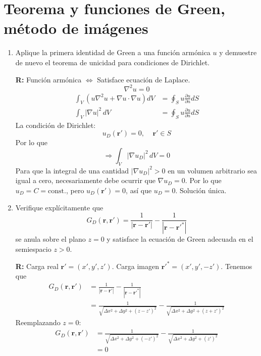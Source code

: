 \documentclass[]{article}
\numberwithin{equation}{section}
\newcommand{\0}{\textcolor{gray}{0}}
\newcommand{\gr}{\nabla}
\newcommand{\la}{\nabla^2}
\newcommand{\rv}{\mathbf{r}}
\newcommand{\rdif}{\rv - \rv'}
\begin{document}
\section{Teorema y funciones de Green, método de imágenes}
\begin{enumerate}
	\item Aplique la primera identidad de Green a una función armónica \(u\) y demuestre de nuevo el 	teorema de unicidad para condiciones de Dirichlet.
	
	\textbf{R:} Función armónica \(\Leftrightarrow\) Satisface ecuación de Laplace.
	\begin{equation*}
		\la u = 0
	\end{equation*}
	\begin{align*}
		\int_{V}(u\la u + \gr u\cdot\gr u)dV &= \oint_{S} u \frac{\partial u}{\partial n}dS\\
		\int_{V}|\gr u|^2 \, dV &= \oint_{S} u \frac{\partial u}{\partial n}dS
	\end{align*}
	La condición de Dirichlet:
	\begin{equation*}
		u_{D}(\rv') = 0, ~~~~~ \rv'\in S
	\end{equation*}
	Por lo que
	\begin{equation*}
		\Rightarrow\int_{V}|\gr u_{D}|^2 \, dV = 0
	\end{equation*}
	Para que la integral de una cantidad \(|\gr u_{D}|^2 > 0\) en un volumen arbitrario sea igual a cero, necesariamente debe ocurrir que \(\gr u_{D} = 0\). Por lo que \(u_{D} = C = \mathrm{const.}\), pero \(u_{D}(\rv') = 0\), así que \(u_{D} = 0\). Solución única.

	\item Verifique explícitamente que
	\begin{equation*}
		G_{D} (\rv, \rv') = \frac{1}{|\rdif|} - \frac{1}{|\rdif^*|}
	\end{equation*}
	se anula sobre el plano \(z = 0\) y satisface la ecuación de Green adecuada en el semiespacio \(z > 0\).
	
	\textbf{R:} Carga real \(\rv' = (x',y',z')\). Carga imagen \(\rv'^* = (x',y',-z')\). Tenemos que
	\begin{align*}
		G_{D} (\rv, \rv') &= \frac{1}{|\rdif|} - \frac{1}{|\rdif^*|}\\
		&= \frac{1}{\sqrt{\Delta x^2 + \Delta y^2 + (z - z')^2}} - \frac{1}{\sqrt{\Delta x^2 + \Delta y^2 + (z + z')^2}}
	\end{align*}
	Reemplazando \(z = 0\):
	\begin{align*}
		G_{D} (\rv, \rv') &= \frac{1}{\sqrt{\Delta x^2 + \Delta y^2 + (- z')^2}} - \frac{1}{\sqrt{\Delta x^2 + \Delta y^2 + (z')^2}}\\
		&= 0
	\end{align*}
	

\end{enumerate}
\end{document}
